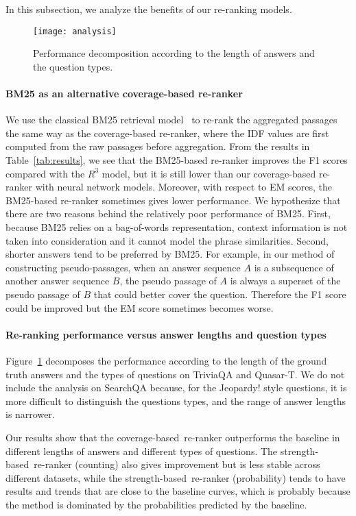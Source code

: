 \documentclass{article} \usepackage{iclr2018_conference,times}
\def \coherence {strength-based}
\def \union {coverage-based}
\begin{document}
In this subsection, we analyze the benefits of our re-ranking models.

\begin{figure}[t]
\centering
\texttt{[image: analysis]}
\vspace{-0.2in}
\caption{Performance decomposition according to the length of answers and the question types. }
\label{fig:analysis}
\end{figure}
\paragraph{BM25 as an alternative coverage-based re-ranker}{
We use the classical BM25 retrieval model~\citep{robertson2009probabilistic} to re-rank the aggregated passages the same way as the coverage-based re-ranker, where the IDF values are first computed from the raw passages before aggregation. From the results in Table~\ref{tab:results}, we see that the BM25-based re-ranker improves the F1 scores compared with the $R^3$ model, but it is still lower than our coverage-based re-ranker with neural network models. Moreover, with respect to EM scores, the BM25-based re-ranker sometimes gives lower performance. We hypothesize that there are two reasons behind the relatively poor performance of BM25. First, because BM25 relies on a bag-of-words representation, context information is not taken into consideration and it cannot model the phrase similarities. Second, shorter answers tend to be preferred by BM25. For example, in our method of constructing pseudo-passages, when an answer sequence $A$ is a subsequence of another answer sequence $B$, the pseudo passage of $A$ is always a superset of the pseudo passage of $B$ that could better cover the question. Therefore the F1 score could be improved but the EM score sometimes becomes worse.
}

\paragraph{Re-ranking performance versus answer lengths and question types}
Figure~\ref{fig:analysis} decomposes the performance according to the length of the ground truth answers and the types of questions on TriviaQA and Quasar-T. We do not include the analysis on SearchQA because, for the Jeopardy! style questions, it is more difficult to distinguish the questions types, and the range of answer lengths is narrower.

Our results show that the \union\ re-ranker outperforms the baseline in different lengths of answers and different types of questions.
The \coherence\ re-ranker (counting) also gives improvement but is less stable across different datasets, while the \coherence\ re-ranker (probability) tends to have results and trends that are close to the baseline curves, which is probably because the method is dominated by the probabilities predicted by the baseline. 
\end{document}
